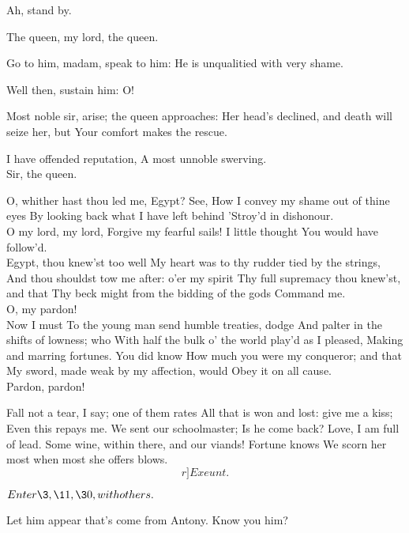 \documentclass{book}
\begin{document}
\2	Ah, stand by.

	The queen, my lord, the queen.

	Go to him, madam, speak to him:
	He is unqualitied with very shame.

\2	Well then, sustain him: O!

	Most noble sir, arise; the queen approaches:
	Her head's declined, and death will seize her, but
	Your comfort makes the rescue.

\1	I have offended reputation,
	A most unnoble swerving. \\

	Sir, the queen.

\1	O, whither hast thou led me, Egypt? See,
	How I convey my shame out of thine eyes
	By looking back what I have left behind
	'Stroy'd in dishonour. \\

\2	O my lord, my lord,
	Forgive my fearful sails! I little thought
	You would have follow'd. \\

\1	Egypt, thou knew'st too well
	My heart was to thy rudder tied by the strings,
	And thou shouldst tow me after: o'er my spirit
	Thy full supremacy thou knew'st, and that
	Thy beck might from the bidding of the gods
	Command me. \\

\2	          O, my pardon! \\

\1	Now I must
	To the young man send humble treaties, dodge
	And palter in the shifts of lowness; who
	With half the bulk o' the world play'd as I pleased,
	Making and marring fortunes. You did know
	How much you were my conqueror; and that
	My sword, made weak by my affection, would
	Obey it on all cause. \\

\2	Pardon, pardon!

\1	Fall not a tear, I say; one of them rates
	All that is won and lost: give me a kiss;
	Even this repays me. We sent our schoolmaster;
	Is he come back? Love, I am full of lead.
	Some wine, within there, and our viands! Fortune knows
	We scorn her most when most she offers blows. \[r]Exeunt.\]





	\(Enter \3, \11, \30, with others.\)

\3	Let him appear that's come from Antony.
	Know you him? \\
\end{document}
